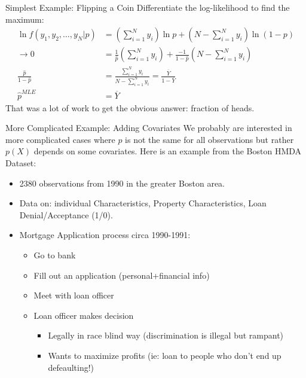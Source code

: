 \documentclass[aspectratio=169,11pt]{beamer}
\begin{document}
\begin{frame}{Simplest Example: Flipping a Coin}
Differentiate the log-likelihood to find the maximum:
\begin{align*}
\ln  f(y_1,y_2,\ldots,y_N | p )  &= \left( \sum_{i=1}^N y_i \right)  \ln p  + \left(N-\sum_{i=1}^N y_i \right)  \ln(1-p)\\
\rightarrow 0&= \frac{1}{\hat{p}}  \left( \sum_{i=1}^N y_i \right) + \frac{-1}{1-\hat{p}}   \left(N-\sum_{i=1}^N y_i \right) \\
 \frac{\hat{p}}{1-\hat{p}} &= \frac{\sum_{i=1}^N y_i }{N- \sum_{i=1}^N y_i } = \frac{\overline{Y}}{1-\overline{Y}} \\
\hat{p}^{MLE} &= \overline{Y}
\end{align*}
That was a lot of work to get the obvious answer: \alert{fraction of heads}.
\end{frame}

\begin{frame}{More Complicated Example: Adding Covariates}
We probably are interested in more complicated cases where $p$ is not the same for all observations but rather $p(X)$ depends on some covariates. Here is an example from the Boston HMDA Dataset:
\begin{itemize}
\item 2380 observations from 1990 in the greater Boston area.
\item Data on: individual Characteristics, Property Characteristics, Loan Denial/Acceptance (1/0).
\item Mortgage Application process circa 1990-1991:
\begin{itemize}
\item Go to bank
\item Fill out an application (personal+financial info)
\item Meet with loan officer
\item Loan officer makes decision
\begin{itemize}
\item Legally in race blind way (discrimination is illegal but rampant)
\item Wants to maximize profits (ie: loan to people who don't end up defeaulting!)
\end{itemize}
\end{itemize}
\end{itemize}
\end{frame}
\end{document}
